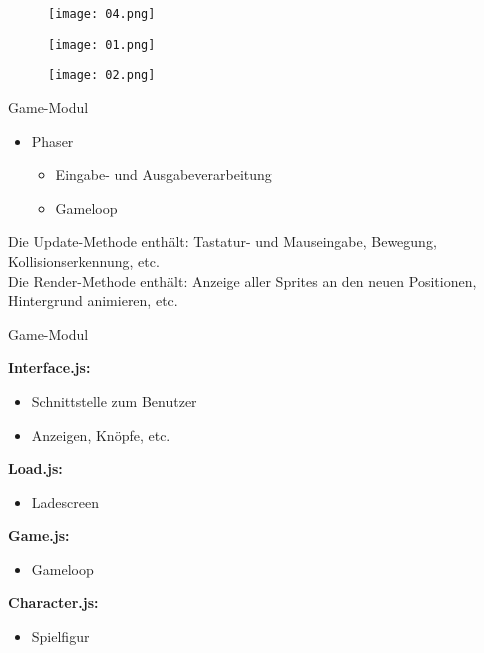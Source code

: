 \documentclass{beamer}
\begin{document}
\begin{frame}
\begin{figure}[htbp] 
  \centering
     \texttt{[image: 04.png]}
\end{figure}

\end{frame}


\begin{frame}
\begin{figure}[htbp] 
  \centering
     \texttt{[image: 01.png]}
\end{figure}
\end{frame}

\begin{frame}
\begin{figure}[htbp] 
  \centering
     \texttt{[image: 02.png]}
\end{figure}

\end{frame}

\begin{frame}{Game-Modul}

\begin{itemize}
\item Phaser
\begin{itemize}
\item Eingabe- und Ausgabeverarbeitung 
\item Gameloop
\end{itemize}
\end{itemize}
Die Update-Methode enthält: Tastatur- und Mauseingabe, Bewegung, Kollisionserkennung, etc. \\

Die Render-Methode enthält: Anzeige aller Sprites an den neuen Positionen, Hintergrund animieren, etc. \\
\end{frame}
\begin{frame}{Game-Modul}

{\flushleft \textbf{Interface.js:}} 
\begin{itemize}
\item Schnittstelle zum Benutzer
\item Anzeigen, Knöpfe, etc.
\end{itemize}
{\flushleft \textbf{Load.js:}}
\begin{itemize}
\item Ladescreen
\end{itemize}
{\flushleft \textbf{Game.js:}}
\begin{itemize}
\item Gameloop
\end{itemize}
{\flushleft\textbf{Character.js:}}
\begin{itemize}
\item Spielfigur
\end{itemize}
\end{frame}
\end{document}
